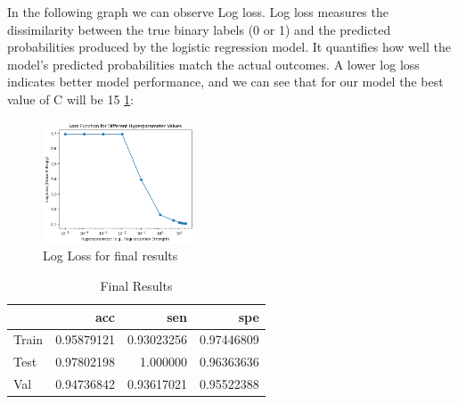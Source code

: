 \documentclass[12pt,a4paper,twocolumn]{article}
\begin{document}
In the following graph we can observe Log loss. Log loss measures the dissimilarity between the true binary labels (0 or 1) and the predicted probabilities produced by the logistic regression model. It quantifies how well the model's predicted probabilities match the actual outcomes. A lower log loss indicates better model performance, and we can see that for our model the best value of C will be 15 \ref{fig:LogLoss}:
\begin{figure}[H]
\includegraphics[width=0.4\textwidth]{images/loss.png}
\centering
\caption{\label{fig:LogLoss} Log Loss for final results}
\end{figure}




\begin{table}[h!]
\begin{tabular}{lrrr}
\toprule
{} &       acc &       sen &       spe \\
\midrule
Train & 0.95879121 &	0.93023256	& 0.97446809 \\
Test &	0.97802198	&1.000000 &	0.96363636 \\
Val &	0.94736842	& 0.93617021	& 0.95522388 \\
\bottomrule
\end{tabular}
    \caption{Final Results}
    \label{tab:results_1}
\end{table}
\end{document}
